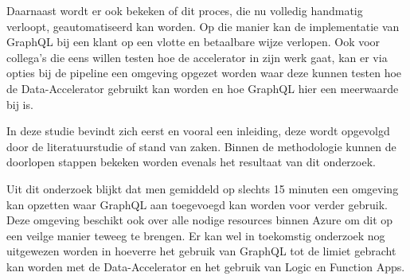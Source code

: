 Daarnaast wordt er ook bekeken of dit proces, die nu volledig handmatig verloopt, geautomatiseerd kan worden. Op die manier kan de implementatie van GraphQL bij een klant op een vlotte en betaalbare wijze verlopen. Ook voor collega's die eens willen testen hoe de accelerator in zijn werk gaat, kan er via opties bij de pipeline een omgeving opgezet worden waar deze kunnen testen hoe de Data-Accelerator gebruikt kan worden en hoe GraphQL hier een meerwaarde bij is.

In deze studie bevindt zich eerst en vooral een inleiding, deze wordt opgevolgd door de literatuurstudie of stand van zaken. Binnen de methodologie kunnen de doorlopen stappen bekeken worden evenals het resultaat van dit onderzoek.

Uit dit onderzoek blijkt dat men gemiddeld op slechts 15 minuten een omgeving kan opzetten waar GraphQL aan toegevoegd kan worden voor verder gebruik. Deze omgeving beschikt ook over alle nodige resources binnen Azure om dit op een veilge manier teweeg te brengen. Er kan wel in toekomstig onderzoek nog uitgewezen worden in hoeverre het gebruik van GraphQL tot de limiet gebracht kan worden met de Data-Accelerator en het gebruik van Logic en Function Apps.
